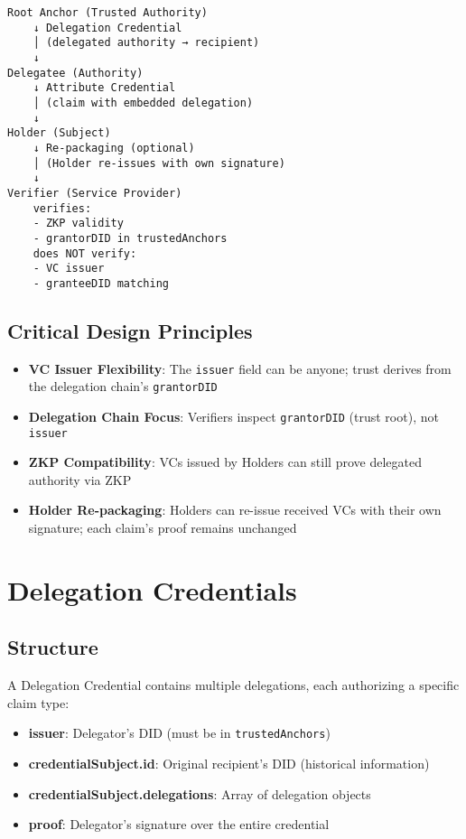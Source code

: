 \begin{center}
\begin{verbatim}
Root Anchor (Trusted Authority)
    ↓ Delegation Credential
    │ (delegated authority → recipient)
    ↓
Delegatee (Authority)
    ↓ Attribute Credential
    │ (claim with embedded delegation)
    ↓
Holder (Subject)
    ↓ Re-packaging (optional)
    │ (Holder re-issues with own signature)
    ↓
Verifier (Service Provider)
    verifies:
    - ZKP validity
    - grantorDID in trustedAnchors
    does NOT verify:
    - VC issuer
    - granteeDID matching
\end{verbatim}
\end{center}

\subsection{Critical Design Principles}

\begin{itemize}
  \item \textbf{VC Issuer Flexibility}: The \texttt{issuer} field can be anyone; trust derives from the delegation chain's \texttt{grantorDID}
  \item \textbf{Delegation Chain Focus}: Verifiers inspect \texttt{grantorDID} (trust root), not \texttt{issuer}
  \item \textbf{ZKP Compatibility}: VCs issued by Holders can still prove delegated authority via ZKP
  \item \textbf{Holder Re-packaging}: Holders can re-issue received VCs with their own signature; each claim's proof remains unchanged
\end{itemize}

\section{Delegation Credentials}

\subsection{Structure}

A Delegation Credential contains multiple delegations, each authorizing a specific claim type:

\begin{itemize}
  \item \textbf{issuer}: Delegator's DID (must be in \texttt{trustedAnchors})
  \item \textbf{credentialSubject.id}: Original recipient's DID (historical information)
  \item \textbf{credentialSubject.delegations}: Array of delegation objects
  \item \textbf{proof}: Delegator's signature over the entire credential
\end{itemize}

